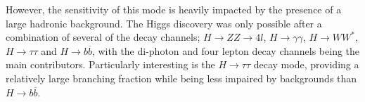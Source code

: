 However, the sensitivity of this mode is heavily impacted by the presence of a large hadronic background. The Higgs discovery was only possible after a combination of several of the decay channels; $H\rightarrow ZZ \rightarrow 4l$, $H\rightarrow \gamma \gamma$, $H\rightarrow WW^*$, $H\rightarrow \tau\tau$ and $H\rightarrow b\overline{b}$, with the di-photon and four lepton decay channels being the main contributors. Particularly interesting is the $H\rightarrow \tau\tau$ decay mode, providing a relatively large branching fraction while being less impaired by backgrounds than $H\rightarrow b\overline{b}$.
